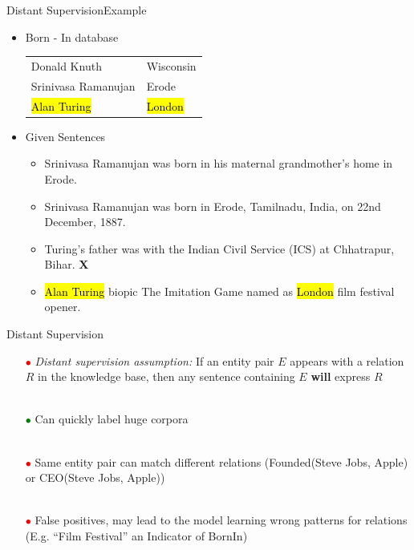 \documentclass{beamer}
\makeatletter
\newcommand\SoulColor{%
  \let\set@color\beamerorig@set@color
  \let\reset@color\beamerorig@reset@color}
\makeatother
\begin{document}
\begin{frame}{Distant Supervision}{Example}
\begin{itemize}
 
\item Born - In database
 \begin{center}
\begin{tabular}{|l|l|}
\hline
Donald Knuth & Wisconsin \\
Srinivasa Ramanujan & Erode \\
\SoulColor\hl{Alan Turing} & \SoulColor\hl{London} \\
\hline
\end{tabular}
\end{center}
\item Given Sentences
\begin{itemize}
\item Srinivasa Ramanujan was born in his maternal grandmother’s home in Erode.   \checkmark
\item Srinivasa Ramanujan was born in Erode, Tamilnadu, India, on 22nd December, 1887.   \checkmark
\item Turing's father was with the Indian Civil Service (ICS) at Chhatrapur, Bihar. \textbf{X}
\item \alert<+> {\SoulColor\hl{Alan Turing} biopic The Imitation Game named as \SoulColor\hl{London} film festival opener.} 
\end{itemize}
\end{itemize}
 
\end{frame}

\begin{frame}{Distant Supervision} \pause
\begin{itemize}
\item[\textcolor{red}{$\bullet$}] \emph{Distant supervision assumption:} If an entity pair $E$ appears with a relation $R$ in the knowledge base, then any sentence containing $E$ \textbf{will} express $R$ \pause \\~\\
\item[\textcolor{green}{$\bullet$}] Can quickly label huge corpora \pause \\~\\
\item[\textcolor{red}{$\bullet$}] Same entity pair can match different relations (Founded(Steve Jobs, Apple) or CEO(Steve Jobs, Apple)) \pause \\~\\
\item[\textcolor{red}{$\bullet$}] False positives, may lead to the model learning wrong patterns for relations (E.g. ``Film Festival'' an Indicator of BornIn) 
\end{itemize}
\end{frame}
\end{document}
